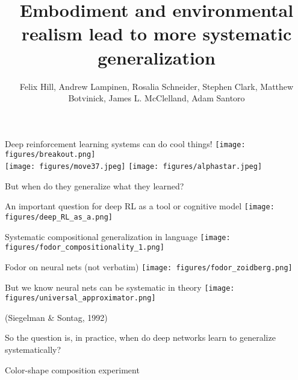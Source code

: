 \documentclass{beamer}
\begin{document}
\title{Embodiment and environmental realism lead to more systematic generalization}
\author{Felix Hill, Andrew Lampinen, Rosalia Schneider, Stephen Clark, Matthew Botvinick, James L. McClelland, Adam Santoro}
\date{}
\frame{\titlepage}

\begin{frame}{Deep reinforcement learning systems can do cool things!}
\vspace{0.5em}
\centering
\texttt{[image: figures/breakout.png]}\\[-2pt]
\texttt{[image: figures/move37.jpeg]}%
\texttt{[image: figures/alphastar.jpeg]}
\end{frame}

\begin{frame}[standout]
But when do they generalize what they learned? 
\end{frame}

\begin{frame}{An important question for deep RL as a tool or cognitive model}
\centering
\texttt{[image: figures/deep\_RL\_as\_a.png]}
\end{frame}

\begin{frame}{Systematic compositional generalization in language}
\vspace{-2em}
\centering
\texttt{[image: figures/fodor\_compositionality\_1.png]}
\end{frame}

\begin{frame}{Fodor on neural nets (not verbatim)}
\centering
\texttt{[image: figures/fodor\_zoidberg.png]}
\end{frame}


\begin{frame}{But we know neural nets can be systematic in theory}
\vspace{5em}
{
\centering
\texttt{[image: figures/universal\_approximator.png]}
}
\vspace{3em}

{\small (Siegelman \& Sontag, 1992)}
\end{frame}

\begin{frame}[standout]
So the question is, in practice, when do deep networks learn to generalize systematically? 
\end{frame}

\begin{frame}{Color-shape composition experiment}
\centering
{}
\end{frame}
\end{document}
